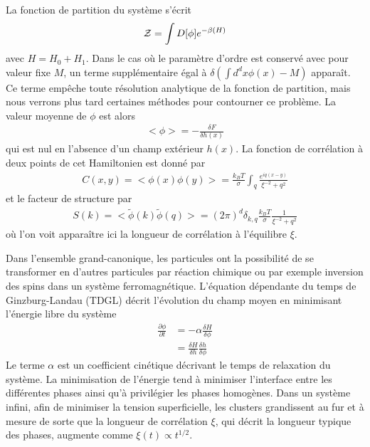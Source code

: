 La fonction de partition du système s'écrit
\begin{align}
    \mathcal{Z} = \int D[\phi] e^{-\beta( H)}
\end{align}
avec $H= H_0 + H_1$. Dans le cas où le paramètre d'ordre est conservé avec pour valeur fixe $M$, un terme supplémentaire égal à $\delta(\int d^dx \phi(x)-M)$ apparaît. Ce terme empêche toute résolution analytique de la fonction de partition, mais nous verrons plus tard certaines méthodes pour contourner ce problème.
La valeur moyenne de $\phi$ est alors
\begin{align}
    <\phi> = - \frac{\delta F}{\delta h(x)}
\end{align}
qui est nul en l'absence d'un champ extérieur $h(x)$. La fonction de corrélation à deux points de cet Hamiltonien est donné par 
\begin{align}
    C(x,y) = <\phi(x)\phi(y)> =  \frac{k_B T}{\sigma} \int_q \frac{e^{iq(x-y)}}{\xi^{-2}+ q^2}
\end{align}
et le facteur de structure  par
\begin{align}
    S(k) = < \tilde{\phi}(k)\tilde{\phi}(q)> = (2\pi)^d \delta_{k,q} \frac{k_B T}{\sigma} \frac{1}{\xi^{-2}+ q^2}
\end{align}
où l'on voit apparaître ici la longueur de corrélation à l'équilibre $\xi$. 

Dans l'ensemble grand-canonique, les particules ont la possibilité de se transformer en d'autres particules par réaction chimique ou par exemple inversion des spins dans un système ferromagnétique. L'équation dépendante du temps de Ginzburg-Landau (TDGL) décrit l'évolution du champ moyen en minimisant l'énergie libre du système
\begin{align}
    \frac{\partial \phi}{\partial t} &= - \alpha \frac{\delta H}{\delta \phi} \\
    &= \frac{\delta H}{\delta h} \frac{\delta h}{\delta \phi}
    \label{tdgl}
\end{align}
Le terme $\alpha$ est un coefficient cinétique décrivant le temps de relaxation du système. La minimisation de l'énergie tend à minimiser l'interface entre les différentes phases ainsi qu'à privilégier les phases homogènes. Dans un système infini, afin de minimiser la tension superficielle, les clusters grandissent au fur et à mesure de sorte que la longueur de corrélation $\xi$, qui décrit la longueur typique des phases, augmente comme $\xi(t) \propto t^{1/2}$.

